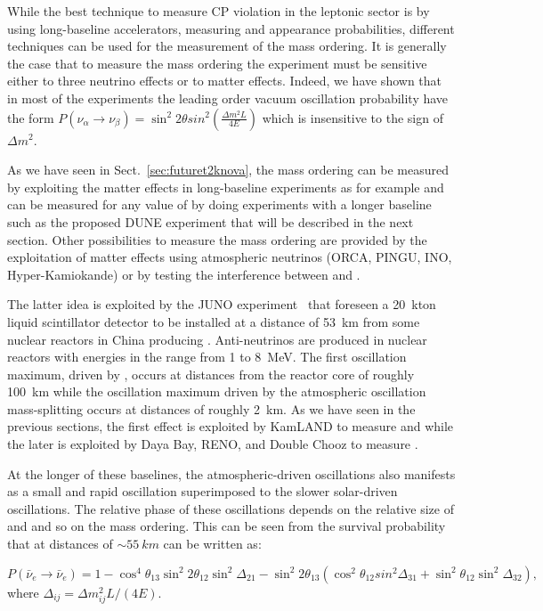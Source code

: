 While the best technique to measure CP violation in the leptonic sector is by using long-baseline accelerators, measuring \nue and \nueb appearance probabilities, different techniques can be used for the measurement of the mass ordering.
It is generally the case that to measure the mass ordering the experiment must be sensitive either to three neutrino effects or to matter effects. Indeed, we have shown that in most of the experiments the leading order vacuum oscillation probability have the form $P(\nu_\alpha \rightarrow \nu_\beta) = \sin^2 2 \theta sin^2 (\frac{\Delta m^2 L}{4E})$ which is insensitive to the sign of $\Delta m^2$. 

As we have seen in Sect.~\ref{sec:futuret2knova}, the mass ordering can be measured by exploiting the matter effects in long-baseline experiments as for example \nova and can be measured for any value of \dcp by doing experiments with a longer baseline such as the proposed DUNE experiment that will be described in the next section. Other possibilities to measure the mass ordering are provided by the exploitation of matter effects using atmospheric neutrinos (ORCA, PINGU, INO, Hyper-Kamiokande) or by testing the interference between \dmsq and \dmsqtwo. 

The latter idea is exploited by the JUNO experiment~\cite{An:2015jdp} that foreseen a 20~kton liquid scintillator detector to be installed at a distance of 53~km from some nuclear reactors in China producing \nueb. 
Anti-neutrinos are produced in nuclear reactors with energies in the range from 1 to 8~MeV. The first oscillation maximum, driven by \dmsqso, occurs at distances from the reactor core of roughly 100~km while the oscillation maximum driven by the atmospheric oscillation mass-splitting \dmsq occurs at distances of roughly 2~km. As we have seen in the previous sections, the first effect is exploited by KamLAND to measure \thsol and \dmsqso while the later is exploited by Daya Bay, RENO, and Double Chooz to measure \thint. 

At the longer of these baselines, the atmospheric-driven oscillations also manifests as a small and rapid oscillation superimposed to the slower solar-driven oscillations. The relative phase of these oscillations depends on the relative size of \dmsq and \dmsqtwo and so on the mass ordering. This can be seen from the \nueb survival probability that at distances of $\sim55~km$ can be written as:

\begin{equation}
P(\bar{\nu}_e \rightarrow \bar{\nu}_e) = 1 - \cos^4 \theta_{13} \sin^2 2 \theta_{12}  \sin ^2 \Delta_{21}
- \sin^2 2 \theta_{13} (\cos^2  \theta_{12} sin^2 \Delta_{31} + \sin^2  \theta_{12}  \sin^2 \Delta_{32} ),
\end{equation} 
where $\Delta_{ij}= \Delta m^2_{ij} L/(4E)$.

